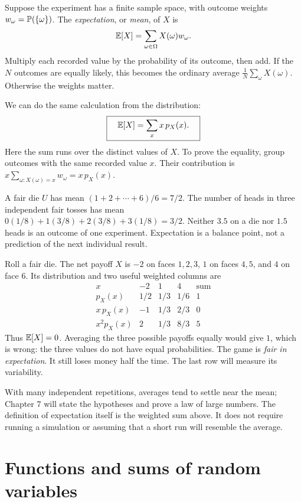 Suppose the experiment has a finite sample space, with outcome weights
$w_\omega=\P(\{\omega\})$. The \emph{expectation}, or \emph{mean}, of $X$ is
\[
 \E[X]=\sum_{\omega\in\Omega}X(\omega)w_\omega.
\]
Multiply each recorded value by the probability of its outcome, then add.
If the $N$ outcomes are equally likely, this becomes the ordinary average
$\frac1N\sum_\omega X(\omega)$. Otherwise the weights matter.

We can do the same calculation from the distribution:
\[
 \boxed{\quad \E[X]=\sum_x x\,p_X(x).\quad}
\]
Here the sum runs over the distinct values of $X$. To prove the equality,
group outcomes with the same recorded value $x$. Their contribution is
$x\sum_{\omega:X(\omega)=x}w_\omega=x\,p_X(x)$.

\begin{example}
A fair die $U$ has mean $(1+2+\cdots+6)/6=7/2$.
The number of heads in three independent fair tosses has mean
$0(1/8)+1(3/8)+2(3/8)+3(1/8)=3/2$.
Neither $3.5$ on a die nor $1.5$ heads is an outcome of one experiment.
Expectation is a balance point, not a prediction of the next individual result.
\end{example}

\begin{example}
Roll a fair die. The net payoff $X$ is $-2$ on faces $1,2,3$,
$1$ on faces $4,5$, and $4$ on face $6$. Its distribution and two
useful weighted columns are
\[
\begin{array}{c|ccc|c}
x&-2&1&4&\text{sum}\\\hline
p_X(x)&1/2&1/3&1/6&1\\
x\,p_X(x)&-1&1/3&2/3&0\\
x^2p_X(x)&2&1/3&8/3&5
\end{array}
\]
Thus $\E[X]=0$. Averaging the three possible payoffs equally would give
$1$, which is wrong: the three values do not have equal probabilities.
The game is \emph{fair in expectation}. It still loses money half the time.
The last row will measure its variability.
\end{example}

With many independent repetitions, averages tend to settle near the mean;
Chapter 7 will state the hypotheses and prove a law of large numbers.
The definition of expectation itself is the weighted sum above.
It does not require running a simulation or assuming that a short run
will resemble the average.

\section{Functions and sums of random variables}
\label{sec:discrete-linearity}

